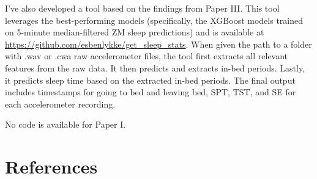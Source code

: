 \documentclass[
  10pt,
]{scrbook}
\begin{document}
I've also developed a tool based on the findings from Paper III. This
tool leverages the best-performing models (specifically, the XGBoost
models trained on 5-minute median-filtered ZM sleep predictions) and is
available at \url{https://github.com/esbenlykke/get_sleep_stats}. When
given the path to a folder with .wav or .cwa raw accelerometer files,
the tool first extracts all relevant features from the raw data. It then
predicts and extracts in-bed periods. Lastly, it predicts sleep time
based on the extracted in-bed periods. The final output includes
timestamps for going to bed and leaving bed, SPT, TST, and SE for each
accelerometer recording.

No code is available for Paper I.

\hypertarget{references}{%
\chapter{References}\label{references}}
\end{document}
